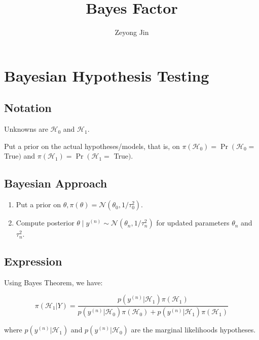 \documentclass[11pt]{article}
\title{\textbf{Bayes Factor}}
\author{Zeyong Jin}
\begin{document}
\maketitle

\tableofcontents

\newpage

\section{Bayesian Hypothesis Testing}

\subsection{Notation}

Unknowns are $\mathcal{H}_{0}$ and $\mathcal{H}_{1}$.

Put a prior on the actual hypotheses/models, that is, on $\pi\left(\mathcal{H}_{0}\right)=\operatorname{Pr}\left(\mathcal{H}_{0}=\right.$ True$)$ and $\pi\left(\mathcal{H}_{1}\right)=\operatorname{Pr}\left(\mathcal{H}_{1}=\right.$ True$)$.

\subsection{Bayesian Approach}

\begin{enumerate}
    \item Put a prior on $\theta, \pi(\theta)=\mathcal{N}\left(\theta_{0}, 1 / \tau_{0}^{2}\right)$.
    \item Compute posterior $\theta \mid y^{(n)} \sim \mathcal{N}\left(\theta_{n}, 1 / \tau_{n}^{2}\right)$ for updated parameters $\theta_{n}$ and $\tau_{n}^{2}$.
\end{enumerate}

\subsection{Expression}

Using Bayes Theorem, we have:

\begin{equation}
    \pi(\mathcal{H}_1 | Y) = \frac{p(y^{(n)} | \mathcal{H}_1)\pi(\mathcal{H}_1)}{p(y^{(n)} | \mathcal{H}_0)\pi(\mathcal{H}_0) + p(y^{(n)} | \mathcal{H}_1)\pi(\mathcal{H}_1)}
\end{equation}

\noindent
where $p(y^{(n)} | \mathcal{H}_1)$ and $p(y^{(n)} | \mathcal{H}_0)$ are the marginal likelihoods hypotheses.
\end{document}
